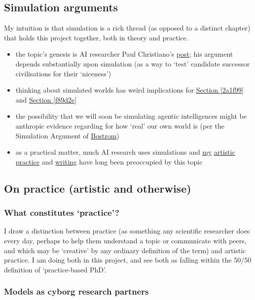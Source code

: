 \documentclass{article}
\begin{document}
\subsection{Simulation arguments}

My intuition is that simulation is a rich thread (as opposed to a distinct chapter) that holds this project together, both in theory and practice. 
\begin{itemize}
\item the topic's genesis is AI researcher Paul Christiano's \href{https://ai-alignment.com/sympathizing-with-ai-e11a4bf5ef6e}{post}; his argument depends substantially upon simulation (as a way to `test' candidate successor civilisations for their `niceness')
\item thinking about simulated worlds has weird implications for \hyperref[2a1f99]{Section \ref*{2a1f99}} and \hyperref[f89d2e]{Section \ref*{f89d2e}} 
\item the possibility that we will soon be simulating agentic intelligences might be anthropic evidence regarding for how `real' our own world is (per the Simulation Argument of \href{https://simulation-argument.com/}{Bostrom})
\item as a practical matter, much AI research uses simulations and \href{http://ukc10014.org/exorbp.html}{my} \href{http://ukc10014.org/sicul.html}{artistic} \href{http://ukc10014.org/islands2.html}{practice} and \href{http://ukc10014.org/writing.html}{writing} have long been preoccupied by this topic
\end{itemize}


\subsection{On practice (artistic and otherwise)}

\label{c164a6}

\subsubsection{What constitutes `practice'?}

I draw a distinction between practice (as something any scientific researcher does every day, perhaps to help them understand a topic or communicate with peers, and which may be `creative' by any ordinary definition of the term) and artistic practice.  I am doing both in this project, and see both as falling within the 50/50 definition of `practice-based PhD'.

\subsubsection{Models as cyborg research partners}
\end{document}
